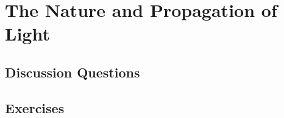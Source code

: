 
\chapter{The Nature and Propagation of Light}

\section{Discussion Questions}

\section{Exercises}
